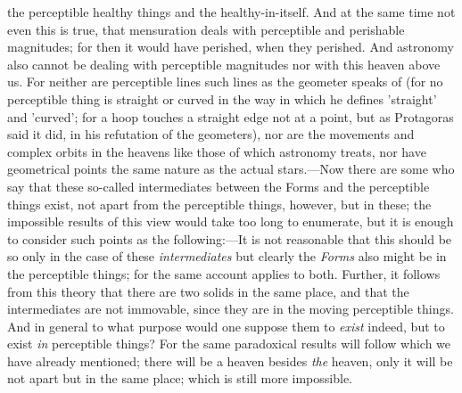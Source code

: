 the perceptible healthy things and the healthy-in-itself. And at the same time not even this is true, that mensuration deals with perceptible and perishable magnitudes; for then it would have perished, when they perished. And astronomy also cannot be dealing with perceptible magnitudes nor with this heaven above us. For neither are perceptible lines such lines as the geometer speaks of (for no perceptible thing is straight or curved in the way in which he defines 'straight' and 'curved'; for a hoop touches a straight edge not at a point, but as Protagoras said it did, in his refutation of the geometers), nor are the movements and complex orbits in the heavens like those of which astronomy treats, nor have geometrical points the same nature as the actual stars.—Now there are some who say that these so-called intermediates between the Forms and the perceptible things exist, not apart from the perceptible things, however, but in these; the impossible results of this view would take too long to enumerate, but it is enough to consider such points as the following:—It is not reasonable that this should be so only in the case of these \emph{intermediates} but clearly the \emph{Forms} also might be in the perceptible things; for the same account applies to both. Further, it follows from this theory that there are two solids in the same place, and that the intermediates are not immovable, since they are in the moving perceptible things. And in general to what purpose would one suppose them to \emph{exist} indeed, but to exist \emph{in} perceptible things? For the same paradoxical results will follow which we have already mentioned; there will be a heaven besides \emph{the} heaven, only it will be not apart but in the same place; which is still more impossible.


